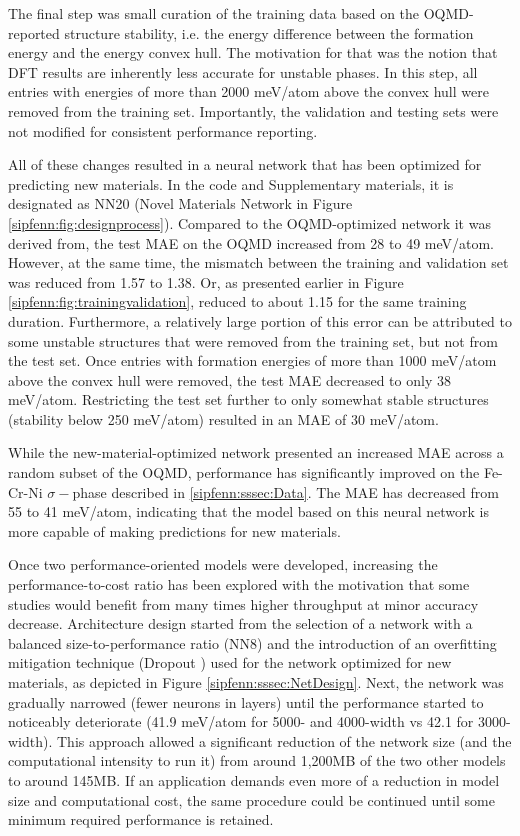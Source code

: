The final step was small curation of the training data based on the OQMD-reported structure stability, i.e. the energy difference between the formation energy and the energy convex hull. The motivation for that was the notion that DFT results are inherently less accurate for unstable phases. In this step, all entries with energies of more than 2000 meV/atom above the convex hull were removed from the training set. Importantly, the validation and testing sets were not modified for consistent performance reporting.

All of these changes resulted in a neural network that has been optimized for predicting new materials. In the code and Supplementary materials, it is designated as NN20 (Novel Materials Network in Figure \ref{sipfenn:fig:designprocess}). Compared to the OQMD-optimized network it was derived from, the test MAE on the OQMD increased from 28 to 49 meV/atom. However, at the same time, the mismatch between the training and validation set was reduced from 1.57 to 1.38. Or, as presented earlier in Figure \ref{sipfenn:fig:trainingvalidation}, reduced to about 1.15 for the same training duration. Furthermore, a relatively large portion of this error can be attributed to some unstable structures that were removed from the training set, but not from the test set. Once entries with formation energies of more than 1000 meV/atom above the convex hull were removed, the test MAE decreased to only 38 meV/atom. Restricting the test set further to only somewhat stable structures (stability below 250 meV/atom) resulted in an MAE of 30 meV/atom.

While the new-material-optimized network presented an increased MAE across a random subset of the OQMD, performance has significantly improved on the Fe-Cr-Ni $\sigma-$phase described in \ref{sipfenn:sssec:Data}. The MAE has decreased from 55 to 41 meV/atom, indicating that the model based on this neural network is more capable of making predictions for new materials.

Once two performance-oriented models were developed, increasing the performance-to-cost ratio has been explored with the motivation that some studies would benefit from many times higher throughput at minor accuracy decrease. Architecture design started from the selection of a network with a balanced size-to-performance ratio (NN8) and the introduction of an overfitting mitigation technique (Dropout \cite{srivastava2014dropout}) used for the network optimized for new materials, as depicted in Figure \ref{sipfenn:sssec:NetDesign}. Next, the network was gradually narrowed (fewer neurons in layers) until the performance started to noticeably deteriorate (41.9 meV/atom for 5000- and 4000-width vs 42.1 for 3000-width). This approach allowed a significant reduction of the network size (and the computational intensity to run it) from around 1,200MB of the two other models to around 145MB. If an application demands even more of a reduction in model size and computational cost, the same procedure could be continued until some minimum required performance is retained. 


\printbibliography[heading=subbibintoc]